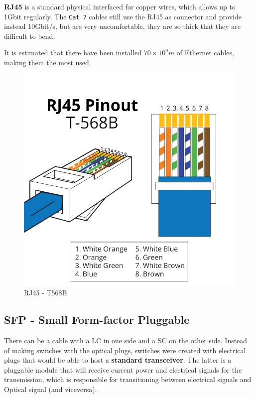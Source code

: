 \begin{paracol}{2}
   \colfill
   \textbf{RJ45} is a standard physical interfaced for copper wires, which allows up to 1Gbit regularly.
   The \texttt{Cat 7} cables still use the RJ45 as connector and provide instead 10Gbit/s, but are very uncomfortable, they are so thick that they are difficult to bend.
   
   It is estimated that there have been installed $70 \times 10^9m$ of Ethernet cables, making them the most used.
   \colfill
   \switchcolumn

   \begin{figure}[htbp]
      \centering
      \includegraphics{images/RJ45_T568B.jpg}
      \caption{RJ45 - T568B}
      \label{fig:RJ45_T568B}
   \end{figure}
\end{paracol}

\subsection{SFP - Small Form-factor Pluggable}
There can be a cable with a LC in one side and a SC on the other side.
Instead of making switches with the optical plugs, switches were created with electrical plugs that would be able to host a \textbf{standard transceiver}.
The latter is a pluggable module that will receive current power and electrical signals for the transmission, which is responsible for transitioning between electrical signals and Optical signal (and viceversa).

